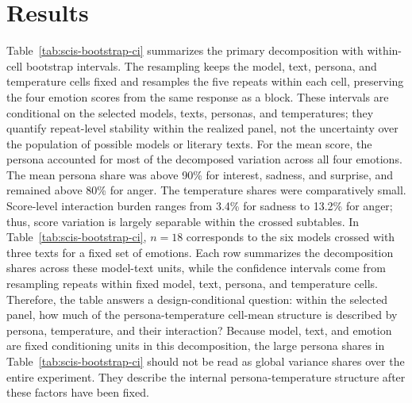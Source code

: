 \documentclass[conference]{IEEEtran}
\begin{document}
\section{Results}
Table~\ref{tab:scis-bootstrap-ci} summarizes the primary decomposition with within-cell bootstrap intervals.
The resampling keeps the model, text, persona, and temperature cells fixed and resamples the five repeats within each cell, preserving the four emotion scores from the same response as a block.
These intervals are conditional on the selected models, texts, personas, and temperatures; they quantify repeat-level stability within the realized panel, not the uncertainty over the population of possible models or literary texts.
For the mean score, the persona accounted for most of the decomposed variation across all four emotions.
The mean persona share was above 90\% for interest, sadness, and surprise, and remained above 80\% for anger.
The temperature shares were comparatively small.
Score-level interaction burden ranges from 3.4\% for sadness to 13.2\% for anger; thus, score variation is largely separable within the crossed subtables.
In Table~\ref{tab:scis-bootstrap-ci}, $n=18$ corresponds to the six models crossed with three texts for a fixed set of emotions.
Each row summarizes the decomposition shares across these model-text units, while the confidence intervals come from resampling repeats within fixed model, text, persona, and temperature cells.
Therefore, the table answers a design-conditional question: within the selected panel, how much of the persona-temperature cell-mean structure is described by persona, temperature, and their interaction?
Because model, text, and emotion are fixed conditioning units in this decomposition, the large persona shares in Table~\ref{tab:scis-bootstrap-ci} should not be read as global variance shares over the entire experiment.
They describe the internal persona-temperature structure after these factors have been fixed.
\end{document}
